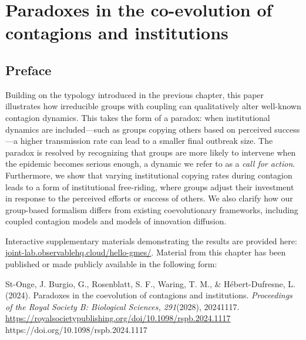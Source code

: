 \chapter{Paradoxes in the co-evolution of contagions and institutions}\label{chapter:coevo}

\newpage
\section*{Preface}

Building on the typology introduced in the previous chapter, this paper illustrates how irreducible groups with coupling can qualitatively alter well-known contagion dynamics. This takes the form of a paradox: when institutional dynamics are included—such as groups copying others based on perceived success—a higher transmission rate can lead to a smaller final outbreak size. The paradox is resolved by recognizing that groups are more likely to intervene when the epidemic becomes serious enough, a dynamic we refer to as a \textit{call for action}. Furthermore, we show that varying institutional copying rates during contagion leads to a form of institutional free-riding, where groups adjust their investment in response to the perceived efforts or success of others. We also clarify how our group-based formalism differs from existing coevolutionary frameworks, including coupled contagion models and models of innovation diffusion.

Interactive supplementary materials demonstrating the results are provided here:\\ \href{https://joint-lab.observablehq.cloud/hello-gmes}{joint-lab.observablehq.cloud/hello-gmes/}. Material from this chapter has been published or made publicly available  in the following form: 
\begingroup
\renewcommand{\section}[2]{}%

\begin{thebibliography}{99}

St-Onge, J.  Burgio, G., Rosenblatt, S. F., Waring, T. M., \& Hébert-Dufresne, L. (2024). Paradoxes in the coevolution of contagions and institutions. \emph{Proceedings of the Royal Society B: Biological Sciences, 291}(2028), 20241117. \url{https://royalsocietypublishing.org/doi/10.1098/rspb.2024.1117} https://doi.org/10.1098/rspb.2024.1117

\end{thebibliography}
\endgroup

